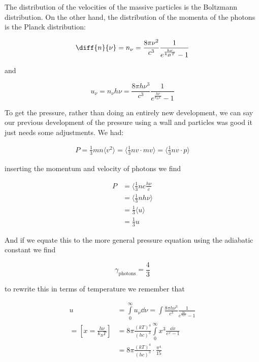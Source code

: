 The distribution of the velocities of the massive particles is the Boltzmann distribution. On the other hand, the distribution of the momenta of the photons is the Planck distribution:

\begin{equation}
	\diff{n}{\nu}=n_\nu = \frac{8\pi \nu^2}{c^3}\frac{1}{e^{\frac{h\nu}{k_BT}}-1}
\end{equation}

and

\begin{equation}
	u_\nu = n_\nu h\nu = \frac{8\pi h\nu^3}{c^3}\frac{1}{e^{\frac{h\nu}{k_BT}}-1}
\end{equation}

To get the pressure, rather than doing an entirely new development, we can say our previous development of the pressure using a wall and particles was good it just needs some adjustments. We had:

\begin{align}
	P =\frac{1}{3}mn\langle v^2 \rangle = \langle \frac{1}{3}nv\cdot mv\rangle = \langle \frac{1}{3}nv\cdot p\rangle
\end{align}

inserting the momentum and velocity of photons we find

\begin{align}
	P &= \langle \frac{1}{3}nc\frac{h\nu}{c}\\
	&= \langle \frac{1}{3}nh\nu\rangle\\
	&= \frac{1}{3}\langle u \rangle\\
	&= \frac{1}{3}u
\end{align}

And if we equate this to the more general pressure equation using the adiabatic constant we find

\begin{equation}
	\gamma_{\text{photons}} = \frac{4}{3}
\end{equation}

to rewrite this in terms of temperature we remember that

\begin{align}
	u &= \int\limits_0^\infty u_\nu\dd\nu = \int\frac{8\pi h\nu^3}{c^3}\frac{1}{e^{\frac{h\nu}{k_BT}}-1}\\
	=[x=\frac{h\nu}{k_BT}] &= 8\pi\frac{(kT)^4}{(hc)^3}\int\limits_0^\infty x^3\frac{\dd x}{e^x-1}\\
	&= 8\pi\frac{(kT)^4}{(hc)^3} \cdot \frac{\pi^4}{15}
\end{align}

